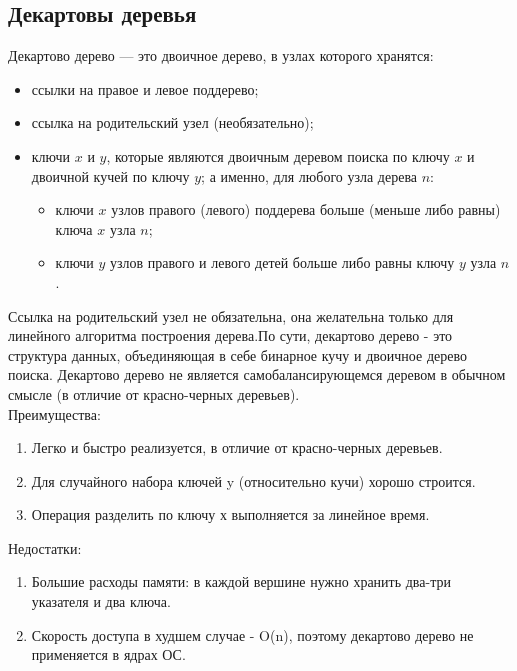 \documentclass[a4paper]{article}
\begin{document}
\subsection{Декартовы деревья}
Декартово дерево — это двоичное дерево, в узлах которого хранятся:
\begin{itemize}
	\item ссылки на правое и левое поддерево;
	\item ссылка на родительский узел (необязательно);
	\item ключи $x$ и $y$, которые являются двоичным деревом поиска по ключу $x$ и двоичной кучей по ключу $y$; а именно, для любого узла дерева $n$:
	\begin{itemize}
		\item ключи $x$ узлов правого (левого) поддерева больше (меньше либо равны) ключа $x$ узла $n$;
		\item ключи $y$ узлов правого и левого детей больше либо равны ключу $y$ узла $n$.
	\end{itemize}
\end{itemize}
Ссылка на родительский узел не обязательна, она желательна только для линейного алгоритма построения дерева.По сути, декартово дерево - это структура данных, объединяющая в себе бинарное кучу и двоичное дерево поиска. Декартово дерево не является самобалансирующемся деревом в обычном смысле (в
отличие от красно-черных деревьев). \\
Преимущества:\begin{enumerate}
	\item Легко и быстро реализуется, в отличие от красно-черных деревьев.
	\item Для случайного набора ключей y (относительно кучи) хорошо строится.
	\item Операция разделить по ключу х выполняется за линейное время.
\end{enumerate}
Недостатки: \begin{enumerate}
	\item Большие расходы памяти: в каждой вершине нужно хранить два-три указателя и два ключа.
	\item Скорость доступа в худшем случае - O(n), поэтому декартово дерево не применяется в ядрах ОС.
\end{enumerate}
\end{document}
